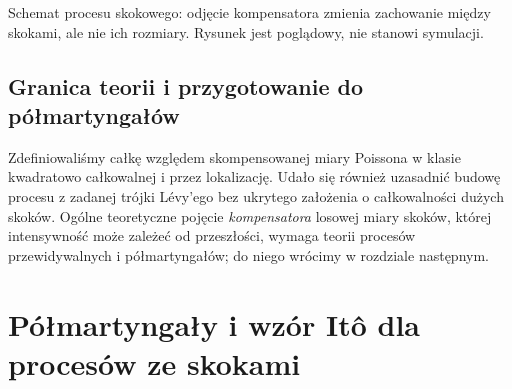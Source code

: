 \documentclass[11pt,a4paper,oneside]{report}
\numberwithin{equation}{chapter}
\theoremstyle{plain}
\theoremstyle{definition}
\theoremstyle{remark}
\begin{document}
\begin{center}
\par\smallskip\small Schemat procesu skokowego: odjęcie kompensatora
zmienia zachowanie między skokami, ale nie ich rozmiary.
Rysunek jest poglądowy, nie stanowi symulacji.
\end{center}

\section{Granica teorii i przygotowanie do półmartyngałów}\label{sec:volIII:11:07}
Zdefiniowaliśmy całkę względem skompensowanej miary
Poissona w klasie kwadratowo całkowalnej i przez lokalizację.
Udało się również uzasadnić budowę procesu z zadanej trójki
Lévy'ego bez ukrytego założenia o całkowalności dużych
skoków. Ogólne teoretyczne pojęcie \emph{kompensatora}
losowej miary skoków, której intensywność może zależeć
od przeszłości, wymaga teorii procesów przewidywalnych
i półmartyngałów; do niego wrócimy w rozdziale następnym.

\chapter{Półmartyngały i wzór Itô dla procesów ze skokami}
\label{chap:volIII:12}
\par\smallskip{}\par\smallskip

\label{ch:semimartingale-jumps}
\end{document}
